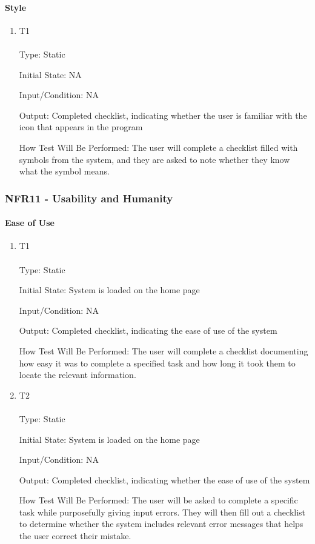 \documentclass[12pt, titlepage]{article}
\begin{document}
\paragraph{Style}
\begin{enumerate}
\item {T1\\}\\
Type: Static

Initial State: NA

Input/Condition: NA

Output: Completed checklist, indicating whether the user is familiar with the icon that appears in the program

How Test Will Be Performed: The user will complete a checklist filled with symbols from the system, and they are asked to note whether they know what the symbol means.
\end{enumerate}

\hypertarget{nfr11}{}
\subsubsection{NFR11 - Usability and Humanity}
\paragraph{Ease of Use}
\begin{enumerate}
\item {T1\\}\\
Type: Static

Initial State: System is loaded on the home page

Input/Condition: NA

Output: Completed checklist, indicating the ease of use of the system

How Test Will Be Performed: The user will complete a checklist documenting how easy it was to complete a specified task and how long it took them to locate the relevant information.
\item {T2\\}\\
Type: Static

Initial State: System is loaded on the home page

Input/Condition: NA

Output: Completed checklist, indicating whether the ease of use of the system

How Test Will Be Performed: The user will be asked to complete a specific task while purposefully giving input errors. They will then fill out a checklist to determine whether the system includes relevant error messages that helps the user correct their mistake.
\end{enumerate}
\end{document}
